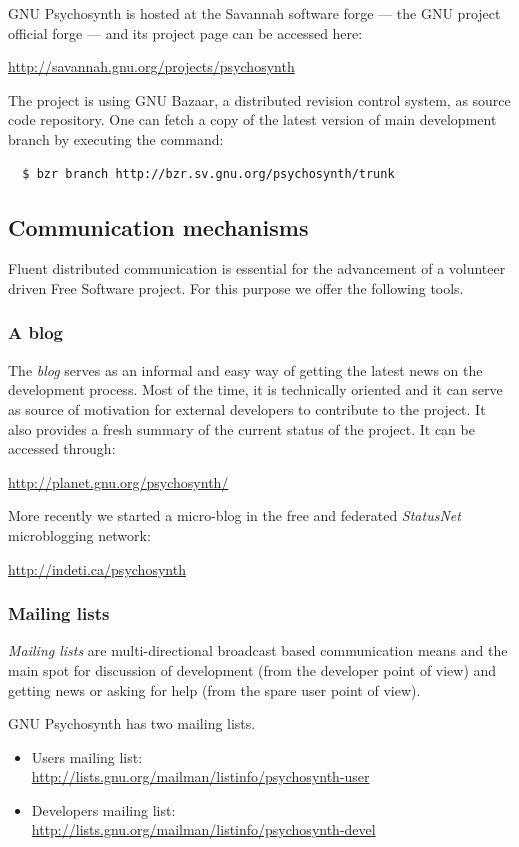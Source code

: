 GNU Psychosynth is hosted at the Savannah software forge --- the GNU
project official forge --- and its project page can be accessed here:

\url{http://savannah.gnu.org/projects/psychosynth}

The project is using GNU Bazaar, a distributed revision control
system, as source code repository. One can fetch a copy of the latest
version of main development branch by executing the command:
\begin{verbatim}
  $ bzr branch http://bzr.sv.gnu.org/psychosynth/trunk
\end{verbatim}

\subsection{Communication mechanisms}

Fluent distributed communication is essential for the advancement of a
volunteer driven Free Software project. For this purpose we offer the
following tools.

\subsubsection{A blog}

The \emph{blog} serves as an informal and easy way of
getting the latest news on the development process. Most of the time,
it is technically oriented and it can serve as source of motivation
for external developers to contribute to the project. It also provides
a fresh summary of the current status of the project. It can be
accessed through:

\url{http://planet.gnu.org/psychosynth/}

More recently we started a micro-blog in the free and federated
\emph{StatusNet} microblogging network:

\url{http://indeti.ca/psychosynth}
 
\subsubsection{Mailing lists}

\emph{Mailing lists} are multi-directional
broadcast based communication means and the main spot for discussion
of development (from the developer point of view) and getting news or
asking for help (from the spare user point of view).

GNU Psychosynth has two mailing lists.
\begin{itemize}
\item Users mailing list: \\
\url{http://lists.gnu.org/mailman/listinfo/psychosynth-user}

\item Developers mailing list:\\
\url{http://lists.gnu.org/mailman/listinfo/psychosynth-devel}
\end{itemize}

